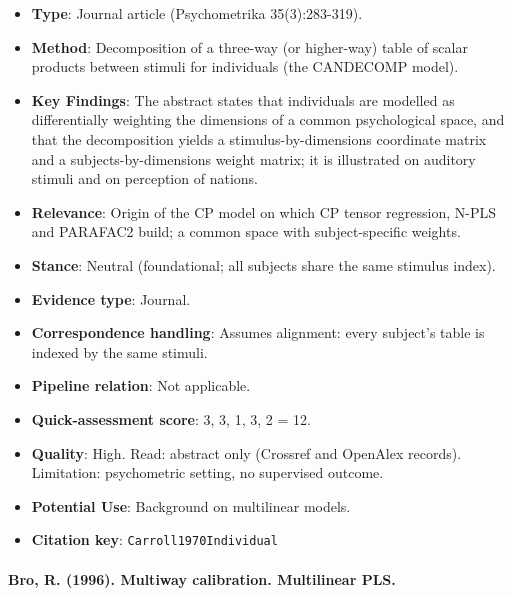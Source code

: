 \documentclass[journal,onecolumn]{IEEEtran}
\begin{document}
\begin{itemize}

\item{} \textbf{Type}: Journal article (Psychometrika 35(3):283-319).

\item{} \textbf{Method}: Decomposition of a three-way (or higher-way) table of scalar products between stimuli for individuals (the CANDECOMP model).

\item{} \textbf{Key Findings}: The abstract states that individuals are modelled as differentially weighting the dimensions of a common psychological space, and that the decomposition yields a stimulus-by-dimensions coordinate matrix and a subjects-by-dimensions weight matrix; it is illustrated on auditory stimuli and on perception of nations.

\item{} \textbf{Relevance}: Origin of the CP model on which CP tensor regression, N-PLS and PARAFAC2 build; a common space with subject-specific weights.

\item{} \textbf{Stance}: Neutral (foundational; all subjects share the same stimulus index).

\item{} \textbf{Evidence type}: Journal.

\item{} \textbf{Correspondence handling}: Assumes alignment: every subject's table is indexed by the same stimuli.

\item{} \textbf{Pipeline relation}: Not applicable.

\item{} \textbf{Quick-assessment score}: 3, 3, 1, 3, 2 = 12.

\item{} \textbf{Quality}: High. Read: abstract only (Crossref and OpenAlex records). Limitation: psychometric setting, no supervised outcome.

\item{} \textbf{Potential Use}: Background on multilinear models.

\item{} \textbf{Citation key}: \texttt{Carroll1970Individual}

\end{itemize}

\paragraph{Bro, R. (1996). Multiway calibration. Multilinear PLS.~\cite{Bro1996Multiway}}\mbox{}
\end{document}
